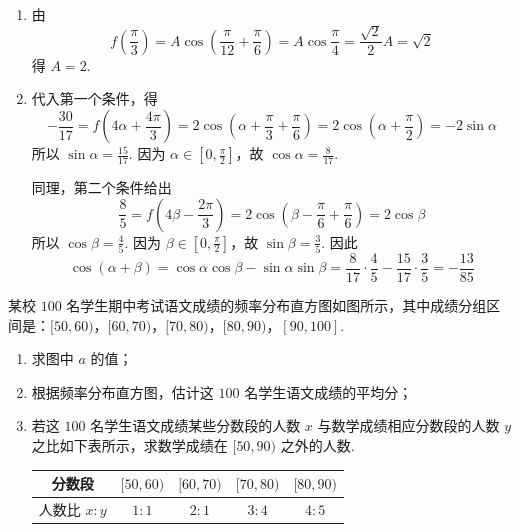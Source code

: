 \begin{solution}
\begin{enumerate}
\item 由
\[
f\left(\frac{\pi}{3}\right)
=A\cos\left(\frac{\pi}{12}+\frac{\pi}{6}\right)
=A\cos\frac{\pi}{4}
=\frac{\sqrt2}{2}A
=\sqrt2
\]
得 \(A=2\).
\item 代入第一个条件，得
\[
-\frac{30}{17}
=f\left(4\alpha+\frac{4\pi}{3}\right)
=2\cos\left(\alpha+\frac{\pi}{3}+\frac{\pi}{6}\right)
=2\cos\left(\alpha+\frac{\pi}{2}\right)
=-2\sin\alpha
\]
所以 \(\sin\alpha=\frac{15}{17}\). 因为 \(\alpha\in[0,\frac{\pi}{2}]\)，故 \(\cos\alpha=\frac{8}{17}\).

同理，第二个条件给出
\[
\frac85=f\left(4\beta-\frac{2\pi}{3}\right)
=2\cos\left(\beta-\frac{\pi}{6}+\frac{\pi}{6}\right)
=2\cos\beta
\]
所以 \(\cos\beta=\frac45\). 因为 \(\beta\in[0,\frac{\pi}{2}]\)，故 \(\sin\beta=\frac35\). 因此
\[
\cos(\alpha+\beta)
=\cos\alpha\cos\beta-\sin\alpha\sin\beta
=\frac8{17}\cdot\frac45-\frac{15}{17}\cdot\frac35
=-\frac{13}{85}
\]
\end{enumerate}
\end{solution}

\begin{problem}
某校 \(100\) 名学生期中考试语文成绩的频率分布直方图如图所示，其中成绩分组区间是：\([50,60)\)，\([60,70)\)，\([70,80)\)，\([80,90)\)，\([90,100]\).

\begin{enumerate}
\item 求图中 \(a\) 的值；
\item 根据频率分布直方图，估计这 \(100\) 名学生语文成绩的平均分；
\item 若这 \(100\) 名学生语文成绩某些分数段的人数 \(x\) 与数学成绩相应分数段的人数 \(y\) 之比如下表所示，求数学成绩在 \([50,90)\) 之外的人数.
\begin{center}
{\setlength{\tabcolsep}{7pt}
\begin{tabular}{c|c|c|c|c}
\hline
分数段 & \([50,60)\) & \([60,70)\) & \([70,80)\) & \([80,90)\) \\
\hline
人数比 \(x:y\) & \(1:1\) & \(2:1\) & \(3:4\) & \(4:5\) \\
\hline
\end{tabular}
}
\end{center}
\end{enumerate}

\end{problem}

